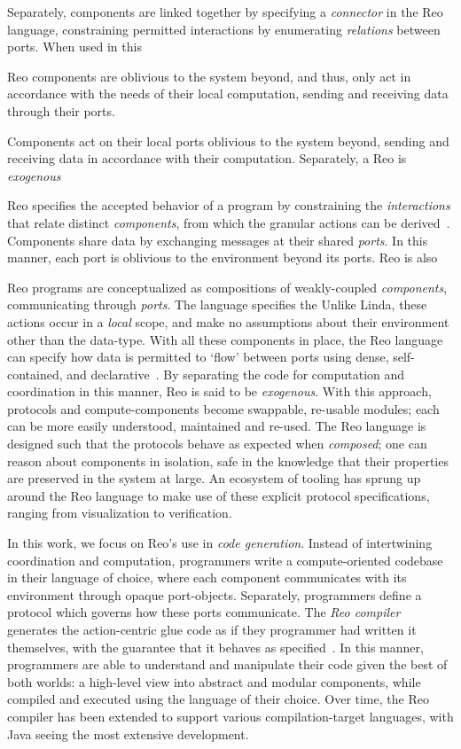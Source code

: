 Separately, components are linked together by specifying a \textit{connector} in the Reo language, constraining permitted interactions by enumerating \textit{relations} between ports. When used in this

Reo components are oblivious to the system beyond, and thus, only act in accordance with the needs of their local computation, sending and receiving data through their ports. 


 Components act on their local ports oblivious to the system beyond, sending and receiving data in accordance with their computation. Separately, a 
Reo is \textit{exogenous}

Reo specifies the accepted behavior of a program by constraining the \textit{interactions} that relate distinct \textit{components}, from which the granular actions can be derived~\cite{arbab2011puff}. Components share data by exchanging messages at their shared \textit{ports}. In this manner, each port is oblivious to the environment beyond its ports. Reo is also 


Reo programs are conceptualized as compositions of weakly-coupled \textit{components}, communicating through \textit{ports}. The language specifies the 
Unlike Linda, these actions occur in a \textit{local} scope, and make no assumptions about their environment other than the data-type. With all these components in place, the Reo language can specify how data is permitted to `flow' between ports using dense, self-contained, and declarative~\cite{arbab2004reo}. By separating the code for computation and coordination in this manner, Reo is said to be \textit{exogenous}. With this approach, protocols and compute-components become swappable, re-usable modules; each can be more easily understood, maintained and re-used. The Reo language is designed such that the protocols behave as expected when \textit{composed}; one can reason about components in isolation, safe in the knowledge that their properties are preserved in the system at large. An ecosystem of tooling has sprung up around the Reo language to make use of these explicit protocol specifications, ranging from visualization to verification. 

In this work, we focus on Reo's use in \textit{code generation}. Instead of intertwining coordination and computation, programmers write a compute-oriented codebase in their language of choice, where each component communicates with its environment through opaque port-objects. Separately, programmers define a protocol which governs how these ports communicate. The \textit{Reo compiler} generates the action-centric glue code as if they programmer had written it themselves, with the guarantee that it behaves as specified~\cite{jongmans2013modularizing}. In this manner, programmers are able to understand and manipulate their code given the best of both worlds: a high-level view into abstract and modular components, while compiled and executed using the language of their choice. Over time, the Reo compiler has been extended to support various compilation-target languages, with Java seeing the most extensive development. 

